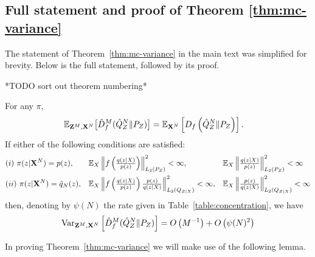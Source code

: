\subsection{Full statement and proof of Theorem \ref{thm:mc-variance}}\label{appendix:full-statment-proof-mc}

The statement of Theorem~\ref{thm:mc-variance} in the main text was simplified for brevity. 
Below is the full statement, followed by its proof.


*TODO sort out theorem numbering*

\begin{theorem}
For any $\pi$,
\begin{align*}
    \mathbb{E}_{\mathbf{Z}^M, \mathbf{X}^N} \bigl[\hat{D}^M_f( \hat{Q}_Z^N \| P_Z)\bigr]
    &=\mathbb{E}_{\mathbf{X}^N} \left[ D_f\left( \hat{Q}^N_Z \| P_Z \right)\right].
\end{align*}
If either of the following conditions are satisfied:
\begin{align*}
&(i) \ \pi(z|\mathbf{X}^N) = p(z),& 
&\textstyle{\mathbb{E}_X \left\| f\left( \frac{q(z|X)}{p(z)}\right) \right\|^2_{L_2(P_Z)}  < \infty,}&
&\textstyle{\mathbb{E}_X \left\| \frac{q(z|X)}{p(z)} \right\|^2_{L_2(P_Z)} < \infty} \\
&(ii) \  \pi(z | \mathbf{X}^N) = \hat{q}_N(z),&
&\textstyle{\mathbb{E}_X \left\| f\left( \frac{q(z|X)}{p(z)}\right)\frac{p(z)}{q(z|X)}\right\|^2_{L_2(Q_{Z|X})} < \infty,}&
&\textstyle{\mathbb{E}_X \left\| \frac{p(z)}{q(z|X)} \right\|^2_{L_2(Q_{Z|X})} < \infty}
\end{align*}
then, denoting by $\psi(N)$ the rate given in Table~\ref{table:concentration}, we have
\begin{align*}
    \text{Var}_{\mathbf{Z}^M, \mathbf{X}^N} \left[\hat{D}^M_f( \hat{Q}_Z^N \| P_Z)  \right] = 
    O\left(M^{-1}\right) + O\left( \psi(N)^2 \right) 
\end{align*}
\end{theorem}

In proving Theorem~\ref{thm:mc-variance} we will make use of the following lemma.

